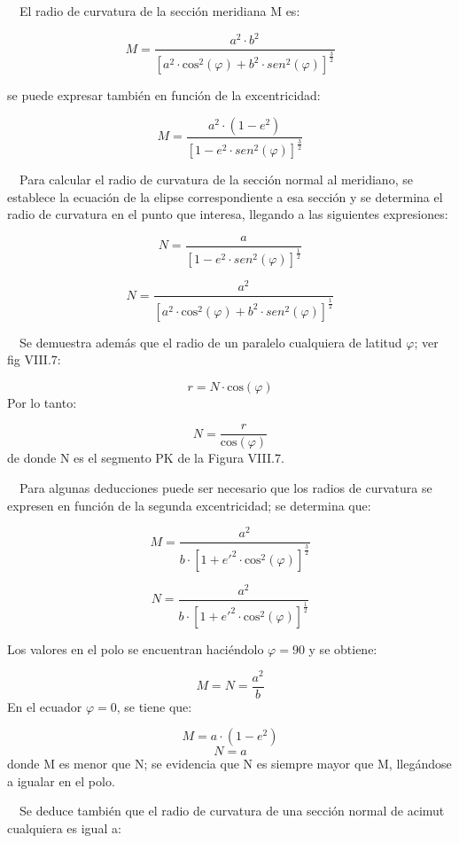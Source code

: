\documentclass[]{article}
\begin{document}
~~El radio de curvatura de la sección meridiana M es:

\[{M=\frac{a^{{2}}\cdot b^{{2}}}{\left[a^{{2}}\cdot \text{cos}^{{2}}\left(\varphi \right)+b^{{2}}\cdot sen^{{2}}\left(\varphi \right)\right]^{{\frac{3}{2}}}}}\]

se puede expresar también en función de la excentricidad:

\[{M=\frac{a^{{2}}\cdot \left(1-e^{{2}}\right)}{\left[1-e^{{2}}\cdot sen^{{2}}\left(\varphi \right)\right]^{{\frac{3}{2}}}}}\]

~~Para calcular el radio de curvatura de la sección normal al meridiano,
se establece la ecuación de la elipse correspondiente a esa sección y se
determina el radio de curvatura en el punto que interesa, llegando a las
siguientes expresiones:

\[{N=\frac{a}{\left[1-e^{{2}}\cdot sen^{{2}}\left(\varphi \right)\right]^{{\frac{1}{2}}}}}\]

\[{N=\frac{a^{{2}}}{\left[a^{{2}}\cdot \text{cos}^{{2}}\left(\varphi \right)+b^{{2}}\cdot sen^{{2}}\left(\varphi \right)\right]^{{\frac{1}{2}}}}}\]

~~Se demuestra además que el radio de un paralelo cualquiera de latitud
\({\varphi }\); ver fig VIII.7:

\[{r=N\cdot \text{cos}\left(\varphi \right)}\] Por lo tanto:

\[{N=\frac{r}{\text{cos}\left(\varphi \right)}}\] de donde N es el
segmento PK de la Figura VIII.7.

~~Para algunas deducciones puede ser necesario que los radios de
curvatura se expresen en función de la segunda excentricidad; se
determina que:

\[{M=\frac{a^{{2}}}{b\cdot \left[1+e'^{{2}}\cdot \text{cos}^{{2}}\left(\varphi \right)\right]^{{\frac{3}{2}}}}}\]

\[{N=\frac{a^{{2}}}{b\cdot \left[1+e'^{{2}}\cdot \text{cos}^{{2}}\left(\varphi \right)\right]^{{\frac{1}{2}}}}}\]

Los valores en el polo se encuentran haciéndolo \({\varphi =\text{90}}\)
y se obtiene:

\[{M=N=\frac{a^{{2}}}{b}}\] En el ecuador \({\varphi =0}\), se tiene
que:

\[{M=a\cdot \left(1-e^{{2}}\right)}\] \[{N=a}\] donde M es menor que N;
se evidencia que N es siempre mayor que M, llegándose a igualar en el
polo.

~~Se deduce también que el radio de curvatura de una sección normal de
acimut cualquiera es igual a:
\end{document}
